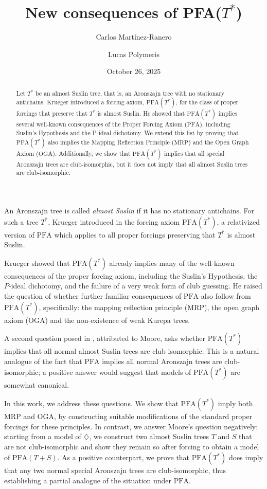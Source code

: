 \documentclass{amsart}
\title{New consequences of PFA($T^*$)}
\date{October 26, 2025}
\author{Carlos Martínez-Ranero}
\author{Lucas Polymeris}
\theoremstyle{definition}
\newcommand{\PFA}{\mathrm{PFA}}
\newcommand{\MRP}{\mathrm{MRP}}
\newcommand{\OGA}{\mathrm{OGA}}
\begin{document}
\begin{abstract}
  Let $T^*$ be an almost Suslin tree, that is, an Aronszajn tree with no stationary antichains. Krueger \cite{Krueger2020} introduced a forcing axiom, $\PFA(T^*)$, for the class of proper forcings that preserve that $T^*$ is almost Suslin. He showed that $\PFA(T^*)$ implies several well-known consequences of the Proper Forcing Axiom ($\PFA$), including Suslin's Hypothesis and the P-ideal dichotomy.
 We extend this list by proving that $\PFA(T^*)$ also implies the Mapping Reflection Principle ($\MRP$) and the Open Graph Axiom ($\OGA$). Additionally, we show that $\PFA(T^*)$ implies that all special Aronszajn trees are club-isomorphic, but it does not imply that all almost Suslin trees are club-isomorphic.
\end{abstract}

\maketitle

An Aronszajn tree is called \emph{almost Suslin} if it has no stationary
antichains. For such a tree $T^*$, Krueger
introduced in \cite{Krueger2020}  the forcing axiom $\PFA(T^{*})$, a relativized version of $\PFA$ which applies to all proper forcings preserving that $T^{*}$ is almost Suslin.

Krueger showed that $\PFA(T^*)$ already implies many of the well-known consequences
of the proper forcing axiom, including the Suslin's Hypothesis,
the $P$-ideal dichotomy,  and the failure of a very weak form of club
guessing. He raised the question of whether further familiar consequences of $\PFA$ also follow from $\PFA(T^*)$, specifically: the mapping reflection principle ($\MRP$), the open graph axiom ($\OGA$) and the non-existence of weak Kurepa trees.

A second question posed in \cite{Krueger2020}, attributed to Moore, asks whether $\PFA(T^*)$
 implies that all normal almost Suslin trees are club isomorphic. This is a natural analogue of the  fact that $\PFA$ implies all normal Aronszajn trees are club-isomorphic; a positive answer would suggest that models of
$\PFA(T^*)$ are somewhat canonical.

In this work, we address these questions. We show that $\PFA(T^{*})$  imply both $\MRP$ and $\OGA$, by constructing suitable modifications of the standard proper forcings for these principles. In contrast, we answer Moore's question negatively: starting from a model of $\diamondsuit$, we construct two almost Suslin trees $T$ and $S$ that are not club-isomorphic and show they remain so after forcing to obtain a model of $\PFA(T+S)$. As a positive counterpart, we prove that $\PFA(T^{*})$ does imply that any two normal special Aronszajn trees are club-isomorphic, thus establishing a partial analogue of the situation under $\PFA$.
\end{document}
